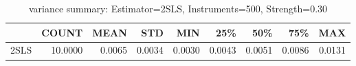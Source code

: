 \begin{table}[ht]
\centering
\caption{variance summary: Estimator=2SLS, Instruments=500, Strength=0.30}
\begin{tabular}{lrrrrrrrr}
\toprule
 & COUNT & MEAN & STD & MIN & 25\% & 50\% & 75\% & MAX \\
\midrule
2SLS & 10.0000 & 0.0065 & 0.0034 & 0.0030 & 0.0043 & 0.0051 & 0.0086 & 0.0131 \\
\bottomrule
\end{tabular}
\end{table}

